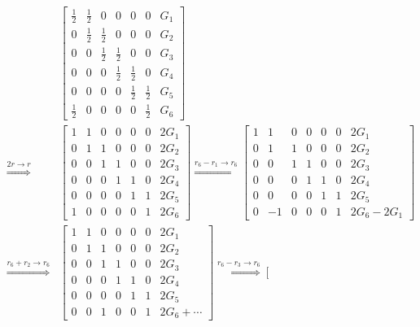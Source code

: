 \documentclass[]{article}
\begin{document}
\begin{align}
	&\left[
	\begin{array}{cccccc|c}
	\frac{1}{2} & \frac{1}{2} & 0 & 0 & 0 & 0 & G_1 \\
	0 & \frac{1}{2} & \frac{1}{2} & 0 & 0 & 0 & G_2 \\
	0 & 0 & \frac{1}{2} & \frac{1}{2} & 0 & 0 & G_3 \\
	0 & 0 & 0 & \frac{1}{2} & \frac{1}{2} & 0 & G_4 \\
	0 & 0 & 0 & 0 & \frac{1}{2} & \frac{1}{2} & G_5 \\
	\frac{1}{2} & 0 & 0 & 0 & 0 & \frac{1}{2} & G_6
	\end{array}
	\right] \\
	\overset{2r \to r}{\Longrightarrow} &\left[
	\begin{array}{cccccc|c}
	1 & 1 & 0 & 0 & 0 & 0 & 2G_1 \\
	0 & 1 & 1 & 0 & 0 & 0 & 2G_2 \\
	0 & 0 & 1 & 1 & 0 & 0 & 2G_3 \\
	0 & 0 & 0 & 1 & 1 & 0 & 2G_4 \\
	0 & 0 & 0 & 0 & 1 & 1 & 2G_5 \\
	1 & 0 & 0 & 0 & 0 & 1 & 2G_6
	\end{array}
	\right] \overset{r_6 - r_1 \to r_6}{\Longrightarrow}
	\left[
	\begin{array}{cccccc|c}
	1 & 1 & 0 & 0 & 0 & 0 & 2G_1 \\
	0 & 1 & 1 & 0 & 0 & 0 & 2G_2 \\
	0 & 0 & 1 & 1 & 0 & 0 & 2G_3 \\
	0 & 0 & 0 & 1 & 1 & 0 & 2G_4 \\
	0 & 0 & 0 & 0 & 1 & 1 & 2G_5 \\
	0 & -1 & 0 & 0 & 0 & 1 & 2G_6 - 2G_1
	\end{array}
	\right] \\
	\overset{r_6 + r_2 \to r_6}{\Longrightarrow} &\left[
	\begin{array}{cccccc|c}
	1 & 1 & 0 & 0 & 0 & 0 & 2G_1 \\
	0 & 1 & 1 & 0 & 0 & 0 & 2G_2 \\
	0 & 0 & 1 & 1 & 0 & 0 & 2G_3 \\
	0 & 0 & 0 & 1 & 1 & 0 & 2G_4 \\
	0 & 0 & 0 & 0 & 1 & 1 & 2G_5 \\
	0 & 0 & 1 & 0 & 0 & 1 & 2G_6 + \cdots
	\end{array}
	\right] \overset{r_6 - r_3 \to r_6}{\Longrightarrow}
	\left[
	\begin{array}{cccccc|c}

\end{array}
\end{align}
\end{document}
